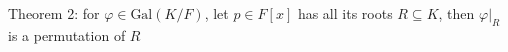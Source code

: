 \documentclass[preview]{standalone}
\begin{document}
\begin{center}
Theorem 2: for $\varphi \in \text{Gal}(K/F)$, let $p \in F[x]$ has all its roots $R \subseteq K$, then $\varphi|_R$ is a permutation of $R$
\end{center}
\end{document}
